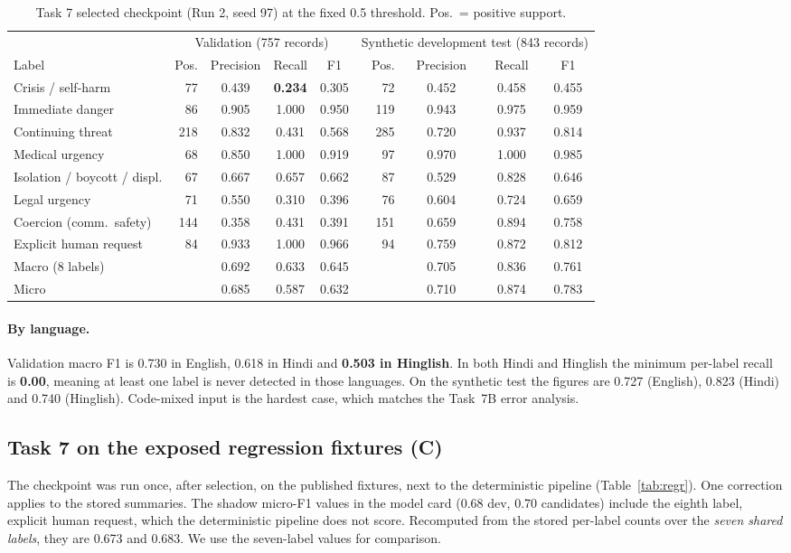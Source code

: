 \documentclass[11pt,a4paper]{article}
\newcommand{\evC}{\textsf{\textbf{C}}}
\begin{document}
\begin{table}[!htbp]
\centering\footnotesize
\caption{Task 7 selected checkpoint (Run 2, seed 97) at the fixed 0.5 threshold. Pos.\ = positive support.}
\label{tab:t7labels}
\begin{tabular}{@{}lrcccrccc@{}}
\toprule
& \multicolumn{4}{c}{Validation (757 records)} & \multicolumn{4}{c}{Synthetic development test (843 records)} \\
\cmidrule(lr){2-5}\cmidrule(l){6-9}
Label & Pos. & Precision & Recall & F1 & Pos. & Precision & Recall & F1 \\
\midrule
Crisis / self-harm & 77 & 0.439 & \textbf{0.234} & 0.305 & 72 & 0.452 & 0.458 & 0.455 \\
Immediate danger & 86 & 0.905 & 1.000 & 0.950 & 119 & 0.943 & 0.975 & 0.959 \\
Continuing threat & 218 & 0.832 & 0.431 & 0.568 & 285 & 0.720 & 0.937 & 0.814 \\
Medical urgency & 68 & 0.850 & 1.000 & 0.919 & 97 & 0.970 & 1.000 & 0.985 \\
Isolation / boycott / displ. & 67 & 0.667 & 0.657 & 0.662 & 87 & 0.529 & 0.828 & 0.646 \\
Legal urgency & 71 & 0.550 & 0.310 & 0.396 & 76 & 0.604 & 0.724 & 0.659 \\
Coercion (comm.\ safety) & 144 & 0.358 & 0.431 & 0.391 & 151 & 0.659 & 0.894 & 0.758 \\
Explicit human request & 84 & 0.933 & 1.000 & 0.966 & 94 & 0.759 & 0.872 & 0.812 \\
\midrule
Macro (8 labels) & & 0.692 & 0.633 & 0.645 & & 0.705 & 0.836 & 0.761 \\
Micro & & 0.685 & 0.587 & 0.632 & & 0.710 & 0.874 & 0.783 \\
\bottomrule
\end{tabular}
\end{table}

\paragraph{By language.} Validation macro F1 is 0.730 in English, 0.618 in Hindi and \textbf{0.503
in Hinglish}. In both Hindi and Hinglish the minimum per-label recall is \textbf{0.00}, meaning at
least one label is never detected in those languages. On the synthetic test the figures are 0.727
(English), 0.823 (Hindi) and 0.740 (Hinglish). Code-mixed input is the hardest case, which matches
the Task~7B error analysis.

\subsection{Task 7 on the exposed regression fixtures (\texorpdfstring{\evC}{C})}
The checkpoint was run once, after selection, on the published fixtures, next to the deterministic
pipeline (Table~\ref{tab:regr}). One correction applies to the stored summaries.
The shadow micro-F1 values in the model card (0.68 dev, 0.70 candidates) include the eighth label,
explicit human request, which the deterministic pipeline does not score. Recomputed from the stored
per-label counts over the \emph{seven shared labels}, they are 0.673 and 0.683. We use the
seven-label values for comparison.
\end{document}
